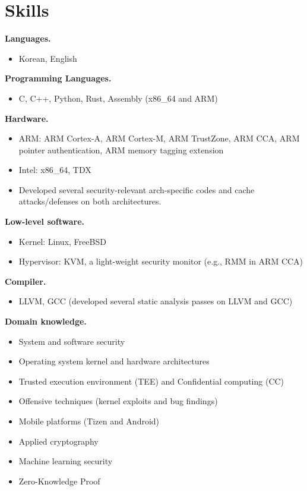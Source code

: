 \documentclass[10pt, a4paper]{article}
\begin{document}
\section{Skills}

\textbf{Languages.}
\begin{itemize}
  \item Korean, English
\end{itemize}

\textbf{Programming Languages.}
\begin{itemize}
  \item C, C++, Python, Rust, Assembly (x86\_64 and ARM)
\end{itemize}

\textbf{Hardware.}
\begin{itemize}
  \item ARM: ARM Cortex-A, ARM Cortex-M, ARM TrustZone, ARM CCA, ARM pointer authentication, ARM memory tagging extension
  \item Intel: x86\_64, TDX
  \item Developed several security-relevant arch-specific codes and cache attacks/defenses on both architectures.
\end{itemize}

\textbf{Low-level software.}
\begin{itemize}
  \item Kernel: Linux, FreeBSD
  \item Hypervisor: KVM, a light-weight security monitor (e.g., RMM in ARM CCA)
\end{itemize}

\textbf{Compiler.}
\begin{itemize}
  \item LLVM, GCC (developed several static analysis passes on LLVM and GCC)
\end{itemize}

\textbf{Domain knowledge.}
\begin{itemize}
  \item System and software security
  \item Operating system kernel and hardware architectures
  \item Trusted execution environment (TEE) and Confidential computing (CC)
  \item Offensive techniques (kernel exploits and bug findings)
  \item Mobile platforms (Tizen and Android)
  \item Applied cryptography
  \item Machine learning security
  \item Zero-Knowledge Proof
\end{itemize}
\end{document}
